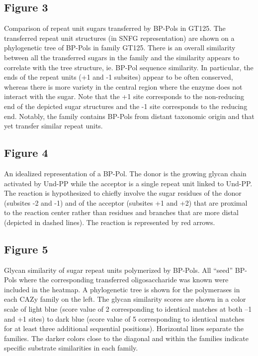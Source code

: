 \documentclass{article}
\begin{document}
\subsection{Figure 3}
Comparison of repeat unit sugars transferred by BP-Pols in GT125. The transferred repeat unit structures (in SNFG representation) are shown on a phylogenetic tree of BP-Pols in family GT125. There is an overall similarity between all the transferred sugars in the family and the similarity appears to correlate with the tree structure, ie. BP-Pol sequence similarity. In particular, the ends of the repeat units (+1 and -1 subsites) appear to be often conserved, whereas there is more variety in the central region where the enzyme does not interact with the sugar. Note that the +1 site corresponds to the non-reducing end of the depicted sugar structures and the -1 site corresponds to the reducing end. Notably, the family contains BP-Pols from distant taxonomic origin and that yet transfer similar repeat units.

\subsection{Figure 4}
An idealized representation of a BP-Pol. The donor is the growing glycan chain activated by Und-PP while the acceptor is a single repeat unit linked to Und-PP. The reaction is hypothesized to chiefly involve the sugar residues of the donor (subsites -2 and -1) and of the acceptor (subsites +1 and +2) that are proximal to the reaction center rather than residues and branches that are more distal (depicted in dashed lines). The reaction is represented by red arrows.

\subsection{Figure 5}
Glycan similarity of sugar repeat units polymerized by BP-Pols. All “seed” BP-Pols where the corresponding transferred oligosaccharide was known were included in the heatmap. A phylogenetic tree is shown for the polymerases in each CAZy family on the left. The glycan similarity scores are shown in a color scale of light blue (score value of 2 corresponding to identical matches at both –1 and +1 sites) to dark blue (score value of 5 corresponding to identical matches for at least three additional sequential positions).  Horizontal lines separate the families. The darker colors close to the diagonal and within the families indicate specific substrate similarities in each family.
\end{document}

